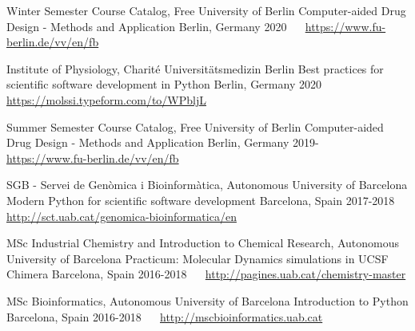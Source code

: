 


\begin{cventries}

  \cventry
    {Winter Semester Course Catalog, Free University of Berlin} %
    {Computer-aided Drug Design - Methods and Application} %
    {Berlin, Germany} %
    {2020} %
    {~~ \footnotesize{\href{https://www.fu-berlin.de/vv/en/fb}{\faGlobe \acvHeaderIconSep https://www.fu-berlin.de/vv/en/fb}}}

  \cventry
    {Institute of Physiology, Charité Universitätsmedizin Berlin} %
    {Best practices for scientific software development in Python} %
    {Berlin, Germany} %
    {2020} %
    {~~ \footnotesize{\href{https://molssi.typeform.com/to/WPbljL}{\faGlobe \acvHeaderIconSep https://molssi.typeform.com/to/WPbljL}}}

  \cventry
    {Summer Semester Course Catalog, Free University of Berlin} %
    {Computer-aided Drug Design - Methods and Application} %
    {Berlin, Germany} %
    {2019-} %
    {~~ \footnotesize{\href{https://www.fu-berlin.de/vv/en/fb}{\faGlobe \acvHeaderIconSep https://www.fu-berlin.de/vv/en/fb}}}

  \cventry
    {SGB - Servei de Genòmica i Bioinformàtica, Autonomous University of Barcelona} %
    {Modern Python for scientific software development} %
    {Barcelona, Spain} %
    {2017-2018} %
    {~~ \footnotesize{\href{http://sct.uab.cat/genomica-bioinformatica/en}{\faGlobe \acvHeaderIconSep http://sct.uab.cat/genomica-bioinformatica/en}}}

  \cventry
    {MSc Industrial Chemistry and Introduction to Chemical Research, Autonomous University of Barcelona} %
    {Practicum: Molecular Dynamics simulations in UCSF Chimera} %
    {Barcelona, Spain} %
    {2016-2018} %
    {~~ \footnotesize{\href{http://pagines.uab.cat/chemistry-master}{\faGlobe \acvHeaderIconSep http://pagines.uab.cat/chemistry-master}}}

  \cventry
    {MSc Bioinformatics, Autonomous University of Barcelona} %
    {Introduction to Python} %
    {Barcelona, Spain} %
    {2016-2018} %
    {~~ \footnotesize{\href{http://mscbioinformatics.uab.cat}{\faGlobe \acvHeaderIconSep http://mscbioinformatics.uab.cat}}}

\end{cventries}
